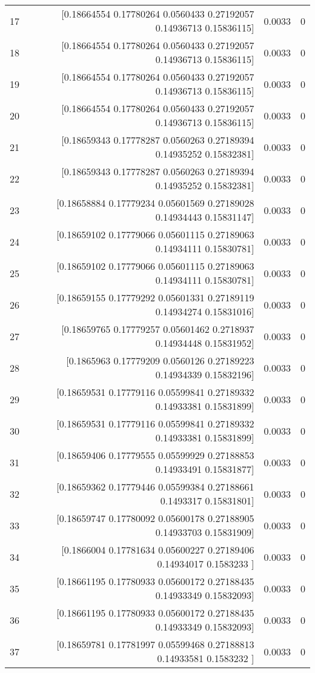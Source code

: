 \begin{longtable}{lrrr}
17 & [0.18664554 0.17780264 0.0560433  0.27192057 0.14936713 0.15836115] & 0.0033 & 0 \\
18 & [0.18664554 0.17780264 0.0560433  0.27192057 0.14936713 0.15836115] & 0.0033 & 0 \\
19 & [0.18664554 0.17780264 0.0560433  0.27192057 0.14936713 0.15836115] & 0.0033 & 0 \\
20 & [0.18664554 0.17780264 0.0560433  0.27192057 0.14936713 0.15836115] & 0.0033 & 0 \\
21 & [0.18659343 0.17778287 0.0560263  0.27189394 0.14935252 0.15832381] & 0.0033 & 0 \\
22 & [0.18659343 0.17778287 0.0560263  0.27189394 0.14935252 0.15832381] & 0.0033 & 0 \\
23 & [0.18658884 0.17779234 0.05601569 0.27189028 0.14934443 0.15831147] & 0.0033 & 0 \\
24 & [0.18659102 0.17779066 0.05601115 0.27189063 0.14934111 0.15830781] & 0.0033 & 0 \\
25 & [0.18659102 0.17779066 0.05601115 0.27189063 0.14934111 0.15830781] & 0.0033 & 0 \\
26 & [0.18659155 0.17779292 0.05601331 0.27189119 0.14934274 0.15831016] & 0.0033 & 0 \\
27 & [0.18659765 0.17779257 0.05601462 0.2718937  0.14934448 0.15831952] & 0.0033 & 0 \\
28 & [0.1865963  0.17779209 0.0560126  0.27189223 0.14934339 0.15832196] & 0.0033 & 0 \\
29 & [0.18659531 0.17779116 0.05599841 0.27189332 0.14933381 0.15831899] & 0.0033 & 0 \\
30 & [0.18659531 0.17779116 0.05599841 0.27189332 0.14933381 0.15831899] & 0.0033 & 0 \\
31 & [0.18659406 0.17779555 0.05599929 0.27188853 0.14933491 0.15831877] & 0.0033 & 0 \\
32 & [0.18659362 0.17779446 0.05599384 0.27188661 0.1493317  0.15831801] & 0.0033 & 0 \\
33 & [0.18659747 0.17780092 0.05600178 0.27188905 0.14933703 0.15831909] & 0.0033 & 0 \\
34 & [0.1866004  0.17781634 0.05600227 0.27189406 0.14934017 0.1583233 ] & 0.0033 & 0 \\
35 & [0.18661195 0.17780933 0.05600172 0.27188435 0.14933349 0.15832093] & 0.0033 & 0 \\
36 & [0.18661195 0.17780933 0.05600172 0.27188435 0.14933349 0.15832093] & 0.0033 & 0 \\
37 & [0.18659781 0.17781997 0.05599468 0.27188813 0.14933581 0.1583232 ] & 0.0033 & 0 \\

\end{longtable}
